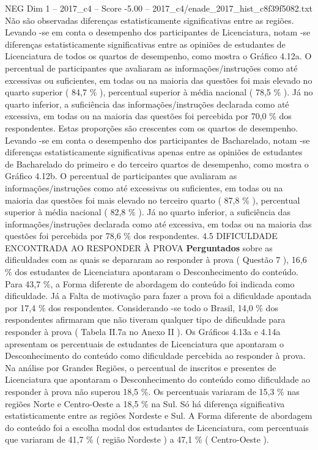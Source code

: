 \begin{textsample}{NEG Dim 1 – 2017\_c4 – Score -5.00 – 2017\_c4/enade\_2017\_hist\_c8f39f5082.txt}
Não são observadas diferenças estatisticamente significativas entre as regiões.
Levando -se em conta o desempenho dos participantes de Licenciatura, notam -se diferenças estatisticamente significativas entre as opiniões de estudantes de Licenciatura de todos os quartos de desempenho, como mostra o Gráfico 4.12a.
O percentual de participantes que avaliaram as informações/instruções como até excessivas ou suficientes, em todas ou na maioria das questões foi mais elevado no quarto superior ( 84,7 \% ), percentual superior à média nacional ( 78,5 \% ).
Já no quarto inferior, a suficiência das informações/instruções declarada como até excessiva, em todas ou na maioria das questões foi percebida por 70,0 \% dos respondentes.
Estas proporções são crescentes com os quartos de desempenho.
Levando -se em conta o desempenho dos participantes de Bacharelado, notam -se diferenças estatisticamente significativas apenas entre as opiniões de estudantes de Bacharelado do primeiro e do terceiro quartos de desempenho, como mostra o Gráfico 4.12b.
O percentual de participantes que avaliaram as informações/instruções como até excessivas ou suficientes, em todas ou na maioria das questões foi mais elevado no terceiro quarto ( 87,8 \% ), percentual superior à média nacional ( 82,8 \% ).
Já no quarto inferior, a suficiência das informações/instruções declarada como até excessiva, em todas ou na maioria das questões foi percebida por 78,6 \% dos respondentes. 4.5 DIFICULDADE ENCONTRADA AO RESPONDER À PROVA \textbf{Perguntados} sobre as dificuldades com as quais se depararam ao responder à prova ( Questão 7 ), 16,6 \% dos estudantes de Licenciatura apontaram o Desconhecimento do conteúdo.
Para 43,7 \%, a Forma diferente de abordagem do conteúdo foi indicada como dificuldade.
Já a Falta de motivação para fazer a prova foi a dificuldade apontada por 17,4 \% dos respondentes.
Considerando -se todo o Brasil, 14,0 \% dos respondentes afirmaram que não tiveram qualquer tipo de dificuldade para responder à prova ( Tabela II.7a no Anexo II ).
Os Gráficos 4.13a e 4.14a apresentam os percentuais de estudantes de Licenciatura que apontaram o Desconhecimento do conteúdo como dificuldade percebida ao responder à prova.
Na análise por Grandes Regiões, o percentual de inscritos e presentes de Licenciatura que apontaram o Desconhecimento do conteúdo como dificuldade ao responder à prova não superou 18,5 \%.
Os percentuais variaram de 15,3 \% nas regiões Norte e Centro-Oeste a 18,5 \% na Sul.
Só há diferença significativa estatisticamente entre as regiões Nordeste e Sul.
A Forma diferente de abordagem do conteúdo foi a escolha modal dos estudantes de Licenciatura, com percentuais que variaram de 41,7 \% ( região Nordeste ) a 47,1 \% ( Centro-Oeste ).

\end{textsample}
